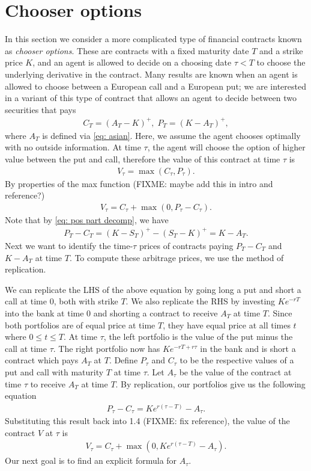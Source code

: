 \documentclass[reqno]{amsart}
\begin{document}
\section{Chooser options}
In this section we consider a more complicated type of financial contracts known as \emph{chooser options}. These are contracts with a fixed maturity date $T$ and a strike price $K$, and an agent is allowed to decide on a choosing date $\tau < T$ to choose the underlying derivative in the contract. Many results are known when an agent is allowed to choose between a European call and a European put; we are interested in a variant of this type of contract that allows an agent to decide between two securities that pays 
\begin{align}
     C_T = (A_T - K)^+, \; P_T = (K - A_T)^+,
\end{align}
where $A_T$ is defined via \eqref{eq: asian}.
Here, we assume the agent chooses optimally with no outside information. At time $\tau$, the agent will choose the option of higher value between the put and call, therefore the value of this contract at time $\tau$ is 
\begin{align}
     V_\tau = \max(C_\tau, P_\tau).
\end{align}
By properties of the max function (FIXME: maybe add this in intro and reference?)
\begin{align}
     V_\tau = C_\tau + \max(0, P_\tau - C_\tau).
\end{align}
Note that by \eqref{eq: pos part decomp}, we have
\begin{align}
     P_T - C_T = (K-S_T)^+ - (S_T - K)^+ = K - A_T. 
\end{align}
Next we want to identify the time-$\tau$ prices of contracts paying $P_T - C_T$ and $K - A_T$ at time $T$. To compute these arbitrage prices, we use the method of replication.

We can replicate the LHS of the above equation by going long a put and short a call at time $0$, both with strike $T$. 
We also replicate the RHS by investing $Ke^{-rT}$ into the bank at time 0 and shorting a contract to receive $A_T$ at time $T$. 
Since both portfolios are of equal price at time $T$, they have equal price at all times $t$ where $0 \leq t \leq T$. 
At time $\tau$, the left portfolio is the value of the put minus the call at time $\tau$. 
The right portfolio now has $Ke^{-rT + r\tau}$ in the bank and is short a contract which pays $A_T$ at $T$.
Define $P_\tau$ and $C_\tau$ to be the respective values of a put and call with maturity $T$ at time $\tau$.
Let $A_\tau$ be the value of the contract at time $\tau$ to receive $A_T$ at time $T$.
By replication, our portfolios give us the following equation
\begin{align}
     P_\tau - C_\tau = Ke^{r(\tau - T)} - A_\tau.
\end{align}
Substituting this result back into 1.4 (FIXME: fix reference), the value of the contract $V$ at $\tau$ is
\begin{align}
     V_\tau = C_\tau + \max(0, Ke^{r(\tau - T)} - A_\tau).
\end{align}
Our next goal is to find an explicit formula for $A_\tau$. 
\end{document}
